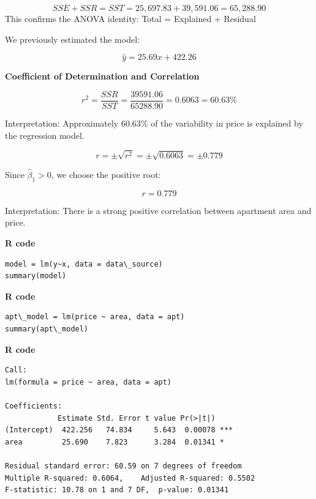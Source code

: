 \begin{example}
\[
SSE + SSR = SST = 25,\!697.83 + 39,\!591.06 = 65,\!288.90
\]
This confirms the ANOVA identity: Total = Explained + Residual

We previously estimated the model:

\[
\hat{y} = 25.69x + 422.26
\]

\textbf{Coefficient of Determination and Correlation}

\[
r^2 = \frac{SSR}{SST} = \frac{39591.06}{65288.90} = 0.6063 = 60.63\%
\]

Interpretation: Approximately 60.63\% of the variability in price is explained by the regression model.

\[
r = \pm \sqrt{r^2} = \pm \sqrt{0.6063} = \pm 0.779
\]

Since \( \hat{\beta}_1 > 0 \), we choose the positive root:

\[
r = 0.779
\]

Interpretation: There is a strong positive correlation between apartment area and price.

\noindent\textbf{R code}
\begin{tcolorbox}[colback=gray!10, colframe=black!45, arc=2mm]
\begin{verbatim}
model = lm(y~x, data = data\_source) 
summary(model)
\end{verbatim}
\end{tcolorbox}

\noindent\textbf{R code}
\begin{tcolorbox}[colback=gray!10, colframe=black!45, arc=2mm]
\begin{verbatim}
apt\_model = lm(price ~ area, data = apt)
summary(apt\_model)
\end{verbatim}
\end{tcolorbox}

\noindent\textbf{R code}
\begin{tcolorbox}[colback=gray!10, colframe=black!45, arc=2mm]
\begin{verbatim}
Call:
lm(formula = price ~ area, data = apt)

Coefficients:
            Estimate Std. Error t value Pr(>|t|)
(Intercept)  422.256   74.834     5.643  0.00078 ***
area         25.690    7.823      3.284  0.01341 *

Residual standard error: 60.59 on 7 degrees of freedom
Multiple R-squared: 0.6064,    Adjusted R-squared: 0.5502 
F-statistic: 10.78 on 1 and 7 DF,  p-value: 0.01341
\end{verbatim}
\end{tcolorbox}


\end{example}
